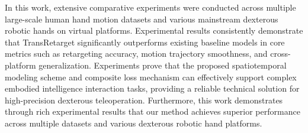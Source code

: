 {	In this work, extensive comparative experiments were conducted across multiple large-scale human hand motion datasets and various mainstream dexterous robotic hands on virtual platforms.
Experimental results consistently demonstrate that TransRetarget significantly outperforms existing baseline models in core metrics such as retargeting accuracy, motion trajectory smoothness, and cross-platform generalization.
Experiments prove that the proposed spatiotemporal modeling scheme and composite loss mechanism can effectively support complex embodied intelligence interaction tasks, providing a reliable technical solution for high-precision dexterous teleoperation.
Furthermore, this work demonstrates through rich experimental results that our method achieves superior performance across multiple datasets and various dexterous robotic hand platforms.
	}
